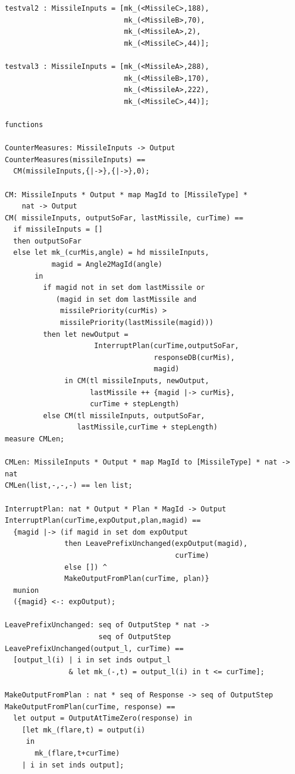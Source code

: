 \documentclass{overturerepchap}
\begin{document}
\begin{lstlisting}
testval2 : MissileInputs = [mk_(<MissileC>,188),
                            mk_(<MissileB>,70),
                            mk_(<MissileA>,2),
                            mk_(<MissileC>,44)];

testval3 : MissileInputs = [mk_(<MissileA>,288),
                            mk_(<MissileB>,170),
                            mk_(<MissileA>,222),
                            mk_(<MissileC>,44)];

functions

CounterMeasures: MissileInputs -> Output
CounterMeasures(missileInputs) ==
  CM(missileInputs,{|->},{|->},0);

CM: MissileInputs * Output * map MagId to [MissileType] * 
    nat -> Output
CM( missileInputs, outputSoFar, lastMissile, curTime) ==
  if missileInputs = []
  then outputSoFar
  else let mk_(curMis,angle) = hd missileInputs,
           magid = Angle2MagId(angle)
       in
         if magid not in set dom lastMissile or
            (magid in set dom lastMissile and
             missilePriority(curMis) > 
             missilePriority(lastMissile(magid)))
         then let newOutput = 
                     InterruptPlan(curTime,outputSoFar,
                                   responseDB(curMis),
                                   magid)
              in CM(tl missileInputs, newOutput, 
                    lastMissile ++ {magid |-> curMis},
                    curTime + stepLength)
         else CM(tl missileInputs, outputSoFar, 
                 lastMissile,curTime + stepLength)
measure CMLen;

CMLen: MissileInputs * Output * map MagId to [MissileType] * nat -> nat
CMLen(list,-,-,-) == len list;

InterruptPlan: nat * Output * Plan * MagId -> Output
InterruptPlan(curTime,expOutput,plan,magid) ==
  {magid |-> (if magid in set dom expOutput
              then LeavePrefixUnchanged(expOutput(magid), 
                                        curTime)
              else []) ^
              MakeOutputFromPlan(curTime, plan)} 
  munion
  ({magid} <-: expOutput);

LeavePrefixUnchanged: seq of OutputStep * nat -> 
                      seq of OutputStep
LeavePrefixUnchanged(output_l, curTime) ==
  [output_l(i) | i in set inds output_l
               & let mk_(-,t) = output_l(i) in t <= curTime];

MakeOutputFromPlan : nat * seq of Response -> seq of OutputStep
MakeOutputFromPlan(curTime, response) ==
  let output = OutputAtTimeZero(response) in
    [let mk_(flare,t) = output(i)
     in
       mk_(flare,t+curTime)
    | i in set inds output];


\end{lstlisting}
\end{document}
